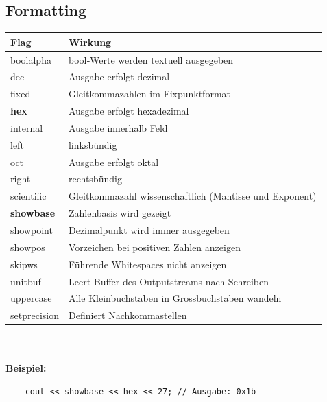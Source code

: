 \subsection{Formatting}
\begin{tabular}{l|p{7cm}}
	\textbf{Flag} & \textbf{Wirkung} \\
	\toprule
	boolalpha & bool‐Werte werden textuell ausgegeben \\ \hline
	dec & Ausgabe erfolgt dezimal \\\hline
	fixed & Gleitkommazahlen im Fixpunktformat \\\hline
	\textbf{hex} & Ausgabe erfolgt hexadezimal \\\hline
	internal & Ausgabe innerhalb Feld \\\hline
	left & linksbündig \\\hline
	oct & Ausgabe erfolgt oktal \\\hline
	right & rechtsbündig \\\hline
	scientific & Gleitkommazahl wissenschaftlich (Mantisse und Exponent) \\\hline
	\textbf{showbase} & Zahlenbasis wird gezeigt \\\hline
	showpoint & Dezimalpunkt wird immer ausgegeben \\\hline
	showpos & Vorzeichen bei positiven Zahlen anzeigen \\\hline
	skipws & Führende Whitespaces nicht anzeigen \\\hline
	unitbuf & Leert Buffer des Outputstreams nach Schreiben \\\hline
	uppercase & Alle Kleinbuchstaben in Grossbuchstaben wandeln\\\hline
	setprecision & Definiert Nachkommastellen
\end{tabular}\\
~\\ 
\noindent\textbf{Beispiel:}\\
\begin{lstlisting}
	cout << showbase << hex << 27; // Ausgabe: 0x1b
\end{lstlisting}

